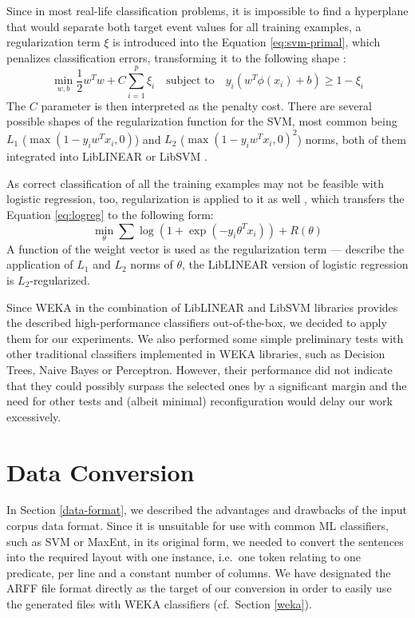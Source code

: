 \documentclass[12pt,notitlepage,a4paper]{report}
\begin{document}
Since in most real-life classification problems, it is impossible to find a hyperplane that would separate both target event values for all training examples, a regularization \citep{neumaier98} term $\xi$ is introduced into the Equation \ref{eq:svm-primal}, which penalizes classification errors, transforming it to the following shape \citep{cortes95}:
\begin{equation}
\min_{w,b} \frac{1}{2}w^T w + C\sum_{i=1}^p \xi_i \quad\mbox{subject to}\quad y_i(w^T\phi(x_i) + b)\geq 1 - \xi_i
\end{equation}
The $C$ parameter is then interpreted as the penalty cost. There are several possible shapes of the regularization function for the SVM, most common being $L_1$ ($\max(1-y_i w^T x_i, 0)$) and $L_2$ ($\max(1-y_i w^T x_i, 0)^2$) norms, both of them integrated into LibLINEAR or LibSVM \citep{fan08,chang01}.

As correct classification of all the training examples may not be feasible with logistic regression, too, regularization is applied to it as well \citep{ng04,fan08}, which transfers the Equation \ref{eq:logreg} to the following form:
\begin{equation}
\min_\theta \sum\log(1 + \exp(-y_i\theta^T x_i)) + R(\theta)
\end{equation}
A function of the weight vector is used as the regularization term --- \citet{ng04} describe the application of $L_1$ and $L_2$ norms of $\theta$, the LibLINEAR version of logistic regression is $L_2$-regularized.

Since WEKA in the combination of LibLINEAR and LibSVM libraries provides the described high-performance classifiers out-of-the-box, we decided to apply them for our experiments. We also performed some simple preliminary tests with other traditional classifiers implemented in WEKA libraries, such as Decision Trees, Naive Bayes or Perceptron. However, their performance did not indicate that they could possibly surpass the selected ones by a significant margin and the need for other tests and (albeit minimal) reconfiguration would delay our work excessively.

\section{Data Conversion}\label{conversion}

In Section \ref{data-format}, we described the advantages and drawbacks of the input corpus data format. Since it is unsuitable for use with common ML classifiers, such as SVM or MaxEnt, in its original form, we needed to convert the sentences into the required layout with one instance, i.e.\ one token relating to one predicate, per line and a constant number of columns. We have designated the ARFF file format directly as the target of our conversion in order to easily use the generated files with WEKA classifiers (cf.\ Section \ref{weka}).
\end{document}
